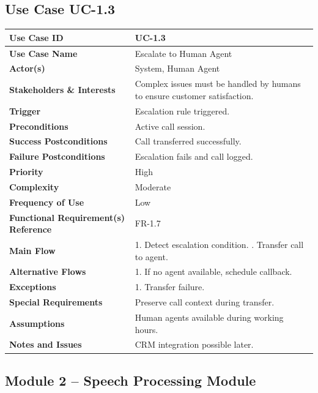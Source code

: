 \documentclass[12pt,a4paper]{report}
\begin{document}
\subsection*{Use Case UC-1.3}
\begin{longtable}{|p{4cm}|p{9cm}|}
\hline
\textbf{Use Case ID} & UC-1.3 \\ \hline
\textbf{Use Case Name} & Escalate to Human Agent \\ \hline
\textbf{Actor(s)} & System, Human Agent \\ \hline
\textbf{Stakeholders \& Interests} & Complex issues must be handled by humans to ensure customer satisfaction. \\ \hline
\textbf{Trigger} & Escalation rule triggered. \\ \hline
\textbf{Preconditions} & Active call session. \\ \hline
\textbf{Success Postconditions} & Call transferred successfully. \\ \hline
\textbf{Failure Postconditions} & Escalation fails and call logged. \\ \hline
\textbf{Priority} & High \\ \hline
\textbf{Complexity} & Moderate \\ \hline
\textbf{Frequency of Use} & Low \\ \hline
\textbf{Functional Requirement(s) Reference} & FR-1.7 \\ \hline
\textbf{Main Flow} &
1. Detect escalation condition. \newline
2. Transfer call to agent. \\ \hline
\textbf{Alternative Flows} &
1. If no agent available, schedule callback. \\ \hline
\textbf{Exceptions} &
1. Transfer failure. \\ \hline
\textbf{Special Requirements} &
Preserve call context during transfer. \\ \hline
\textbf{Assumptions} &
Human agents available during working hours. \\ \hline
\textbf{Notes and Issues} &
CRM integration possible later. \\ \hline
\end{longtable}

\subsection{Module 2 – Speech Processing Module}
\end{document}
